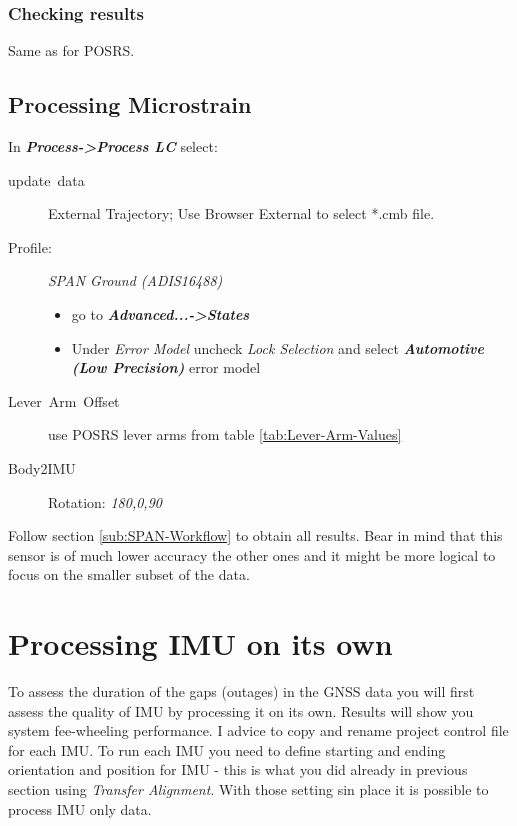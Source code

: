 \documentclass[11pt,fleqn]{book} %
\begin{document}
\subsection{Checking results}

Same as for POSRS.

\section{Processing Microstrain}\label{sub:Processing-Microstrain}

In \textbf{\emph{Process->Process LC}} select:
\begin{description}
	\item [{update~data}] External Trajectory; Use Browser External to select {*}.cmb file.
	\item [{Profile:}] \emph{SPAN Ground (ADIS16488) }
		\begin{itemize}
			\item go to \textbf{\emph{Advanced...->States}}
			\item Under \emph{Error Model} uncheck \emph{Lock Selection} and select \textbf{\emph{Automotive (Low Precision)}} error model
		\end{itemize}
	\item [{Lever~Arm~Offset}] use POSRS lever arms from table \ref{tab:Lever-Arm-Values}
	\item [{Body2IMU}] Rotation: \emph{180,0,90 }
\end{description}

Follow section \ref{sub:SPAN-Workflow} to obtain all results. Bear in mind that this sensor is of much lower accuracy the other ones and it might be more logical to focus on the smaller subset of the data.

\chapter{Processing IMU on its own}\label{Processing-IMU-on-its-own}

To assess the duration of the gaps (outages) in the GNSS data you will first assess the quality of IMU by processing it on its own. Results will show you system fee-wheeling performance. I advice to copy and rename project control file for each IMU. To run each IMU you need to define starting and ending orientation and position for IMU - this is what you did already in previous section using \emph{Transfer Alignment}. With those setting sin place it is possible to process IMU only data. 
\end{document}
